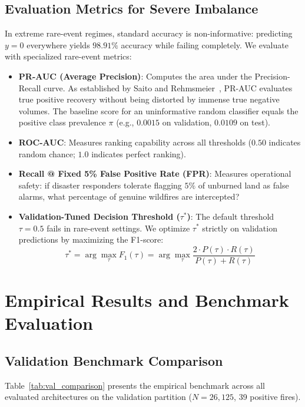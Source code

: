 \documentclass[10pt,journal,compsoc]{IEEEtran}
\begin{document}
\subsection{Evaluation Metrics for Severe Imbalance}
In extreme rare-event regimes, standard accuracy is non-informative: predicting $y=0$ everywhere yields $98.91\%$ accuracy while failing completely. We evaluate with specialized rare-event metrics:
\begin{itemize}
    \item \textbf{PR-AUC (Average Precision)}: Computes the area under the Precision-Recall curve. As established by Saito and Rehmsmeier~\cite{saito2015precision}, PR-AUC evaluates true positive recovery without being distorted by immense true negative volumes. The baseline score for an uninformative random classifier equals the positive class prevalence $\pi$ (e.g., $0.0015$ on validation, $0.0109$ on test).
    \item \textbf{ROC-AUC}: Measures ranking capability across all thresholds ($0.50$ indicates random chance; $1.0$ indicates perfect ranking).
    \item \textbf{Recall @ Fixed 5\% False Positive Rate (FPR)}: Measures operational safety: if disaster responders tolerate flagging $5\%$ of unburned land as false alarms, what percentage of genuine wildfires are intercepted?
    \item \textbf{Validation-Tuned Decision Threshold ($\tau^*$)}: The default threshold $\tau=0.5$ fails in rare-event settings. We optimize $\tau^*$ strictly on validation predictions by maximizing the F1-score:
    \begin{equation}
        \tau^* = \arg\max_{\tau} F_1(\tau) = \arg\max_{\tau} \frac{2 \cdot P(\tau) \cdot R(\tau)}{P(\tau) + R(\tau)}
    \end{equation}
\end{itemize}

\section{Empirical Results and Benchmark Evaluation}

\subsection{Validation Benchmark Comparison}
Table~\ref{tab:val_comparison} presents the empirical benchmark across all evaluated architectures on the validation partition ($N=26,125$, 39 positive fires).
\end{document}
